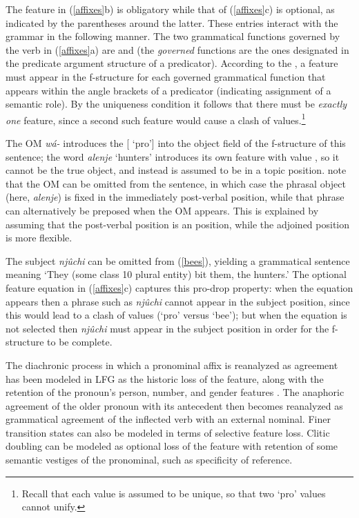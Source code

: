 \noindent
The  feature in (\ref{affixes}b) is obligatory while that of (\ref{affixes}c) is optional, as indicated by the parentheses around the latter.  These entries interact with the grammar in the following manner.  The two grammatical functions governed by the verb in (\ref{affixes}a) are  and  (the \textit{governed} functions are the ones designated in the predicate argument structure of a predicator).  According to the , a  feature must appear in the f-structure for each governed grammatical function that appears within the angle brackets of a predicator (indicating assignment of a semantic role).  By the uniqueness condition it follows that there must be \textit{exactly one}  feature, since a second such feature would cause a clash of values.\footnote{Recall that each  value is assumed to be unique, so that two `{pro}' values cannot unify.}  

The OM {\it w\'{a}-} introduces the [ `{pro}'] into the object field of the f-structure of this sentence; the word \textit{alenje} `hunters' introduces its own  feature with value , so it cannot be the true object, and instead is assumed to be in a topic position.  \citet{bresnan+mchombo:1987} note that the OM can be omitted from the sentence, in which case the phrasal object (here, \textit{alenje}) is fixed in the immediately post-verbal position, while that phrase can alternatively be preposed when the OM appears.  This is explained by assuming that the post-verbal position is an  position, while the adjoined  position is more flexible.  

The subject \textit{nj\^{u}chi} can be omitted from (\ref{bees}), yielding a grammatical sentence meaning `They (some class 10 plural entity) bit them, the hunters.'  The optional  feature equation in (\ref{affixes}c) captures this pro-drop property: when the equation appears then a phrase such as \textit{nj\^{u}chi} cannot appear in the subject position, since this would lead to a clash of  values 
(`{pro}' versus `{bee}'); but when the equation is not selected then  \textit{nj\^{u}chi} must appear in the subject position in order for the f-structure to be complete.  

The diachronic process in which a pronominal affix is reanalyzed as agreement has been modeled in LFG as the historic loss of the  feature, along with the retention of the pronoun's person, number, and gender features \citep{coppock+wechsler:2010}.  The anaphoric agreement of the older pronoun with its antecedent then becomes reanalyzed as grammatical agreement of the inflected verb with an external nominal.  Finer transition states can also be modeled in terms of selective feature loss.  Clitic doubling can be modeled as optional loss of the  feature with retention of some semantic vestiges of the pronominal, such as specificity of reference.

